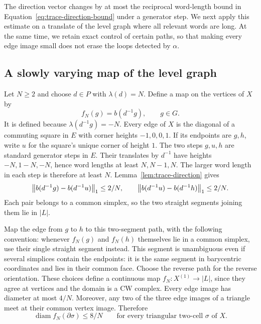 The direction vector changes by at most the reciprocal word-length
bound in Equation~\eqref{eq:trace-direction-bound} under a generator
step. We next apply this estimate on a translate of the level graph
where all relevant words are long. At the same time, we retain exact
control of certain paths, so that making every edge image small does
not erase the loops detected by $\alpha$.

\subsection{A slowly varying map of the level graph}

Let $N\geq2$ and choose $d\in P$ with $\lambda(d)=N$.  Define a map on
the vertices of $X$ by
\begin{equation}\label{eq:translated-direction-map}
 f_N(g)=b(d^{-1}g),\qquad g\in G.
\end{equation}
It is defined because $\lambda(d^{-1}g)=-N$.  Every edge of $X$ is
the diagonal of a commuting square in $E$ with corner heights
$-1,0,0,1$.  If its endpoints are $g,h$, write $u$ for the square's
unique corner of height $1$.  The two steps $g,u,h$ are standard
generator steps in $E$.  Their translates by $d^{-1}$ have heights
$-N,1-N,-N$, hence word lengths at least $N,N-1,N$.
The larger word length in each step is therefore at least $N$.
Lemma~\ref{lem:trace-direction} gives
\[
 \left\lVert b(d^{-1}g)-b(d^{-1}u)\right\rVert_1\leq 2/N,
 \qquad
 \left\lVert b(d^{-1}u)-b(d^{-1}h)\right\rVert_1\leq 2/N.
\]
Each pair belongs to a common simplex, so the two straight segments
joining them lie in $|L|$.

Map the edge from $g$ to $h$ to this two-segment path, with the
following convention: whenever $f_N(g)$ and $f_N(h)$ themselves lie
in a common simplex, use their single straight segment instead.
This segment is unambiguous even if several simplices contain the
endpoints: it is the same segment in barycentric coordinates and lies
in their common face.  Choose the reverse path for the reverse
orientation.  These choices define a continuous map
$f_N:X^{(1)}\to |L|$, since they agree at vertices and the domain is a
CW complex.  Every edge image has diameter at most $4/N$.  Moreover,
any two of the three edge images of a triangle meet at their common
vertex image.  Therefore
\begin{equation}\label{eq:small-triangle-image}
 \operatorname{diam} f_N(\partial\sigma)\leq 8/N
 \qquad\text{for every triangular two-cell $\sigma$ of $X$.}
\end{equation}

